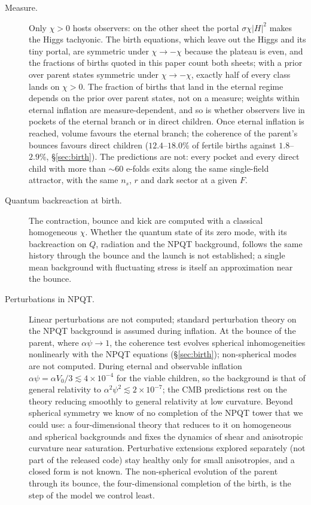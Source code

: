 \documentclass[11pt,a4paper]{article}
\begin{document}
\begin{description}
\item[Measure.] Only $\chi>0$ hosts observers: on the other sheet the portal $\sigma\chi|H|^2$ makes the Higgs tachyonic. The birth equations, which leave out the Higgs and its tiny portal, are symmetric under $\chi\to-\chi$ because the plateau is even, and the fractions of births quoted in this paper count both sheets; with a prior over parent states symmetric under $\chi\to-\chi$, exactly half of every class lands on $\chi>0$. The fraction of births that land in the eternal regime depends on the prior over parent states, not on a measure; weights within eternal inflation are measure-dependent, and so is whether observers live in pockets of the eternal branch or in direct children. Once eternal inflation is reached, volume favours the eternal branch; the coherence of the parent's bounces favours direct children ($12.4$--$18.0\%$ of fertile births against $1.8$--$2.9\%$, \S\ref{sec:birth}). The predictions are not: every pocket and every direct child with more than $\sim60$ e-folds exits along the same single-field attractor, with the same $n_s$, $r$ and dark sector at a given $F$.
\item[Quantum backreaction at birth.] The contraction, bounce and kick are computed with a classical homogeneous $\chi$. Whether the quantum state of its zero mode, with its backreaction on $Q$, radiation and the NPQT background, follows the same history through the bounce and the launch is not established; a single mean background with fluctuating stress is itself an approximation near the bounce.
\item[Perturbations in NPQT.] Linear perturbations are not computed; standard perturbation theory on the NPQT background is assumed during inflation. At the bounce of the parent, where $\alpha\psi\to1$, the coherence test evolves spherical inhomogeneities nonlinearly with the NPQT equations (\S\ref{sec:birth}); non-spherical modes are not computed. During eternal and observable inflation $\alpha\psi=\alpha V_0/3\lesssim4\times10^{-4}$ for the viable children, so the background is that of general relativity to $\alpha^2\psi^2\lesssim2\times10^{-7}$; the CMB predictions rest on the theory reducing smoothly to general relativity at low curvature. Beyond spherical symmetry we know of no completion of the NPQT tower that we could use: a four-dimensional theory that reduces to it on homogeneous and spherical backgrounds and fixes the dynamics of shear and anisotropic curvature near saturation. Perturbative extensions explored separately (not part of the released code) stay healthy only for small anisotropies, and a closed form is not known. The non-spherical evolution of the parent through its bounce, the four-dimensional completion of the birth, is the step of the model we control least.

\end{description}
\end{document}
